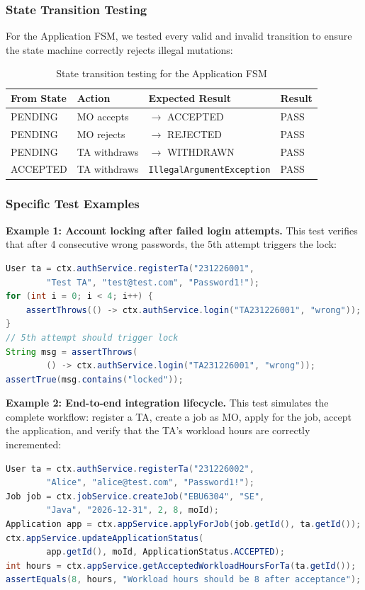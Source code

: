 \documentclass[12pt, a4paper]{article}
\begin{document}
\subsubsection{State Transition Testing}
For the Application FSM, we tested every valid and invalid transition to ensure the state machine correctly rejects illegal mutations:

\begin{table}[H]
\centering
\renewcommand{\arraystretch}{1.3}
\begin{tabular}{|l|l|l|l|}
\hline
\textbf{From State} & \textbf{Action} & \textbf{Expected Result} & \textbf{Result} \\ \hline
PENDING & MO accepts & $\rightarrow$ ACCEPTED & PASS \\ \hline
PENDING & MO rejects & $\rightarrow$ REJECTED & PASS \\ \hline
PENDING & TA withdraws & $\rightarrow$ WITHDRAWN & PASS \\ \hline
ACCEPTED & TA withdraws & \texttt{IllegalArgumentException} & PASS \\ \hline
\end{tabular}
\caption{State transition testing for the Application FSM}
\end{table}

\subsubsection{Specific Test Examples}

\textbf{Example 1: Account locking after failed login attempts.}
This test verifies that after 4 consecutive wrong passwords, the 5th attempt triggers the lock:
\begin{lstlisting}[language=Java]
User ta = ctx.authService.registerTa("231226001", 
        "Test TA", "test@test.com", "Password1!");
for (int i = 0; i < 4; i++) {
    assertThrows(() -> ctx.authService.login("TA231226001", "wrong"));
}
// 5th attempt should trigger lock
String msg = assertThrows(
        () -> ctx.authService.login("TA231226001", "wrong"));
assertTrue(msg.contains("locked"));
\end{lstlisting}

\textbf{Example 2: End-to-end integration lifecycle.}
This test simulates the complete workflow: register a TA, create a job as MO, apply for the job, accept the application, and verify that the TA's workload hours are correctly incremented:
\begin{lstlisting}[language=Java]
User ta = ctx.authService.registerTa("231226002",
        "Alice", "alice@test.com", "Password1!");
Job job = ctx.jobService.createJob("EBU6304", "SE", 
        "Java", "2026-12-31", 2, 8, moId);
Application app = ctx.appService.applyForJob(job.getId(), ta.getId());
ctx.appService.updateApplicationStatus(
        app.getId(), moId, ApplicationStatus.ACCEPTED);
int hours = ctx.appService.getAcceptedWorkloadHoursForTa(ta.getId());
assertEquals(8, hours, "Workload hours should be 8 after acceptance");
\end{lstlisting}
\end{document}
